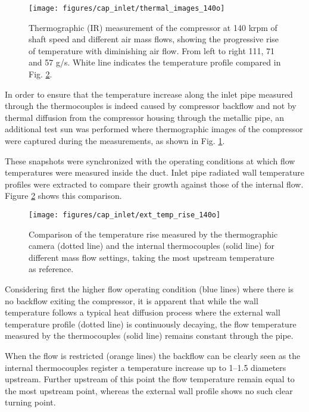 \begin{figure}[!htb]
\centering
\texttt{[image: figures/cap\_inlet/thermal\_images\_140o]}
\caption{Thermographic (IR) measurement of the compressor at 140 krpm of shaft speed and different air mass flows, showing the progressive rise of temperature with diminishing air flow. From left to right 111, 71 and 57 g/s. White line indicates the temperature profile compared in Fig. \ref{fig:temp_ext_comp}.}
\label{fig:thermal_images}
\end{figure}

In order to ensure that the temperature increase along the inlet pipe measured through the thermocouples is indeed caused by compressor backflow and not by thermal diffusion from the compressor housing through the metallic pipe, an additional test sun was performed where thermographic images of the compressor were captured during the measurements, as shown in Fig. \ref{fig:thermal_images}.

These snapshots were synchronized with the operating conditions at which flow temperatures were measured inside the duct. Inlet pipe radiated wall temperature profiles were extracted to compare their growth against those of the internal flow. Figure \ref{fig:temp_ext_comp} shows this comparison. 

\begin{figure}[!hbt]
\centering
\texttt{[image: figures/cap\_inlet/ext\_temp\_rise\_140o]}
\caption{Comparison of the temperature rise measured by the thermographic camera (dotted line) and the internal thermocouples (solid line) for different mass flow settings, taking the most upstream temperature as reference.}
\label{fig:temp_ext_comp}
\end{figure}

Considering first the higher flow operating condition (blue lines) where there is no backflow exiting the compressor, it is apparent that while the wall temperature follows a typical heat diffusion process where the external wall temperature profile (dotted line) is continuously decaying, the flow temperature measured by the thermocouples (solid line) remains constant through the pipe.

When the flow is restricted (orange lines) the backflow can be clearly seen as the internal thermocouples register a temperature increase up to 1--1.5 diameters upstream. Further upstream of this point the flow temperature remain equal to the most upstream point, whereas the external wall profile shows no such clear turning point.

